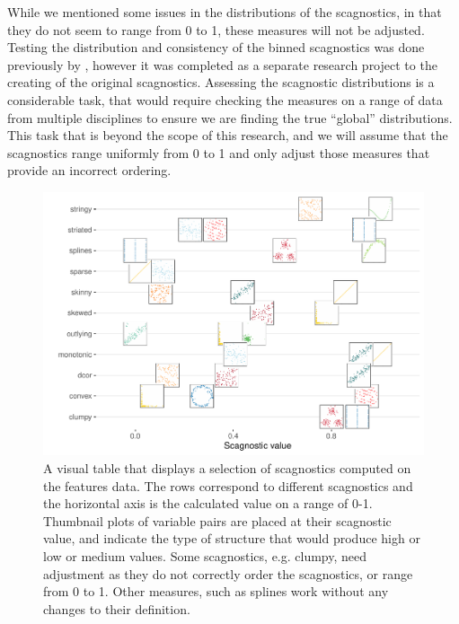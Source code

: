 While we mentioned some issues in the distributions of the scagnostics,
in that they do not seem to range from 0 to 1, these measures will not
be adjusted. Testing the distribution and consistency of the binned
scagnostics was done previously by \citet{scagdist}, however it was
completed as a separate research project to the creating of the original
scagnostics. Assessing the scagnostic distributions is a considerable
task, that would require checking the measures on a range of data from
multiple disciplines to ensure we are finding the true ``global''
distributions. This task that is beyond the scope of this research, and
we will assume that the scagnostics range uniformly from 0 to 1 and only
adjust those measures that provide an incorrect ordering.

\begin{Schunk}
\begin{figure}
\includegraphics[width=1\linewidth]{mason-lee-laa-cook_files/figure-latex/visual-table-1} \caption[A visual table that displays a selection of scagnostics computed on the features data]{A visual table that displays a selection of scagnostics computed on the features data. The rows correspond to different scagnostics and the horizontal axis is the calculated value on a range of 0-1. Thumbnail plots of variable pairs are placed at their scagnostic value, and indicate the type of structure that would produce high or low or medium values. Some scagnostics, e.g. clumpy, need adjustment as they do not correctly order the scagnostics, or range from 0 to 1. Other measures, such as splines work without any changes to their definition.}\label{fig:visual-table}
\end{figure}
\end{Schunk}

